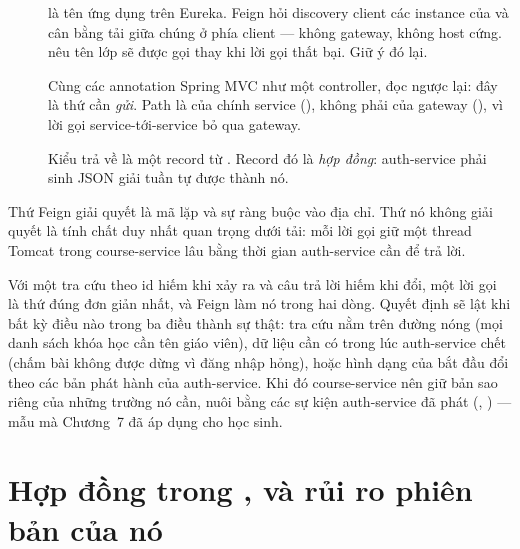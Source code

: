 \begin{description}
  \item[]  là tên ứng dụng trên Eureka. Feign hỏi
  discovery client các instance của  và cân bằng
  tải giữa chúng ở phía client --- không gateway, không host cứng.
   nêu tên lớp sẽ được gọi thay khi lời gọi thất bại.
  Giữ ý đó lại.
  \item[] Cùng các annotation Spring MVC như một controller, đọc
  ngược lại: đây là thứ cần \emph{gửi}. Path là của chính service
  (), không phải của gateway
  (), vì lời gọi service-tới-service bỏ qua
  gateway.
  \item[] Kiểu trả về là một record từ . Record đó
  là \emph{hợp đồng}: auth-service phải sinh JSON giải tuần tự được
  thành nó.
\end{description}

Thứ Feign giải quyết là mã lặp và sự ràng buộc vào địa chỉ. Thứ nó
không giải quyết là tính chất duy nhất quan trọng dưới tải: mỗi lời gọi
giữ một thread Tomcat trong course-service lâu bằng thời gian
auth-service cần để trả lời.

\begin{decision}
Với một tra cứu theo id hiếm khi xảy ra và câu trả lời hiếm khi đổi,
một lời gọi là thứ đúng đơn giản nhất, và Feign làm nó trong hai dòng.
Quyết định sẽ lật khi bất kỳ điều nào trong ba điều thành sự thật: tra
cứu nằm trên đường nóng (mọi danh sách khóa học cần tên giáo viên), dữ
liệu cần có trong lúc auth-service chết (chấm bài không được dừng vì
đăng nhập hỏng), hoặc hình dạng của  bắt đầu đổi theo các
bản phát hành của auth-service. Khi đó course-service nên giữ bản sao
riêng của những trường nó cần, nuôi bằng các sự kiện auth-service đã
phát (, ) --- mẫu mà
Chương~7 đã áp dụng cho học sinh.
\end{decision}

\section{Hợp đồng trong , và rủi ro phiên bản của nó}


